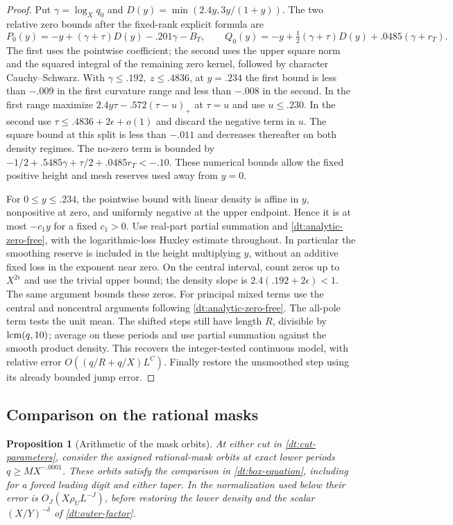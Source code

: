\documentclass[11pt,a4paper]{article}
\theoremstyle{paperplain}
\newtheorem{proposition}[theorem]{Proposition}
\numberwithin{equation}{section}
\begin{document}
\begin{proof}
Put \(\gamma=\log_X q_0\) and \(D(y)=\min(2.4y,3y/(1+y))\).
The two relative zero bounds after the fixed-rank explicit formula
are
\[
 P_0(y)=-y+(\gamma+\tau)D(y)-.201\gamma-B_T,\qquad
 Q_0(y)=-y+\tfrac12(\gamma+\tau)D(y)+.0485(\gamma+r_T).
\]
The first uses the pointwise coefficient; the second uses the
upper square norm and the squared integral of the remaining zero
kernel, followed by character Cauchy--Schwarz.
With \(\gamma\le.192,\ z\le .4836\), at \(y=.234\) the first bound
is less than \(-.009\) in the first curvature range and less than
\(-.008\) in the second. In the first range maximize
\(2.4y\tau-.572(\tau-u)_+\) at \(\tau=u\) and use \(u\le.230\).
In the second use \(\tau\le.4836+2\epsilon+o(1)\) and discard the
negative term in \(u\). The square bound at this split is less
than \(-.011\) and decreases thereafter on both density regimes.
The no-zero term is bounded by
\(-1/2+.5485\gamma+\tau/2+.0485r_T<-.10\).
These numerical bounds allow the fixed positive height and mesh
reserves used away from \(y=0\).

For \(0\le y\le .234\), the pointwise bound with linear density is
affine in \(y\), nonpositive at zero, and uniformly negative at the
upper endpoint. Hence it is at most \(-c_1y\) for a fixed \(c_1>0\).
Use real-part partial summation and \eqref{dt:analytic-zero-free},
with the logarithmic-loss Huxley estimate throughout. In particular
the smoothing reserve is included in the height multiplying \(y\),
without an additive fixed loss in the exponent near zero.
On the central interval, count zeros up to \(X^{2\epsilon}\)
and use the trivial upper bound; the density slope is
\(2.4(.192+2\epsilon)<1\). The same argument bounds these zeros.
For principal mixed terms use the central and noncentral arguments
following \eqref{dt:analytic-zero-free}. The all-pole term tests the
unit mean. The shifted steps still have length \(R\), divisible
by \({\rm lcm}(q,10)\); average on these periods and use partial
summation against the smooth product density. This recovers the
integer-tested continuous model, with relative error
\(O((q/R+q/X)L^C)\). Finally restore the unsmoothed step using its
already bounded jump error.
\end{proof}

\subsection{Comparison on the rational masks}

\begin{proposition}[Arithmetic of the mask orbits]\label{dt:analytic-mask}
At either cut in \eqref{dt:cut-parameters}, consider the assigned
rational-mask orbits at exact lower periods \(q\ge MX^{-.0001}\).
These orbits satisfy the comparison in \eqref{dt:box-equation},
including for a forced leading digit and either taper.
In the normalization used below their error is
\(O_J(X\rho_U L^{-J})\), before restoring the lower density and
the scalar \((X/Y)^{-\delta}\) of \eqref{dt:outer-factor}.
\end{proposition}
\end{document}
